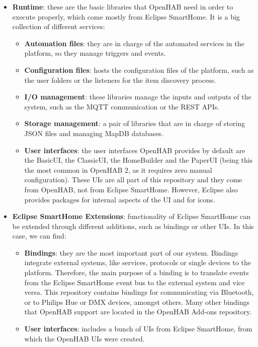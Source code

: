 \begin{itemize}
	\item \textbf{Runtime}: these are the basic libraries that OpenHAB need in order to execute properly, which come mostly from Eclipse 
	SmartHome. It is a big collection of different services:
	\begin{itemize}
		\item \textbf{Automation files}: they are in charge of the automated services in the platform, so they manage triggers and events.
		\item \textbf{Configuration files}: hosts the configuration files of the platform, such as the user folders or the listeners for the 
		item discovery process.
		\item \textbf{I/O management}: these libraries manage the inputs and outputs of the system, such as the MQTT communication 
		or the REST APIs.
		\item \textbf{Storage management}: a pair of libraries that are in charge of storing JSON files and managing MapDB databases. 
		\item \textbf{User interfaces}: the user interfaces OpenHAB provides by default are the BasicUI, the ClassicUI, the HomeBuilder 
		and the PaperUI (being this the most common in OpenHAB 2, as it requires zero manual configuration). These UIs are all part 
		of this repository and they come from OpenHAB, not from Eclipse SmartHome. However, Eclipse also provides packages for 
		internal aspects of the UI and for icons.
	\end{itemize}
	\item \textbf{Eclipse SmartHome Extensions}: functionality of Eclipse SmartHome can be extended through different additions, such 
	as bindings or other UIs. In this case, we can find:
	\begin{itemize}
		\item \textbf{Bindings}: they are the most important part of our system. Bindings integrate external systems, like services, protocols 
		or single devices to the platform. Therefore, the main purpose of a binding is to translate events from the Eclipse SmartHome 
		event bus to the external system and vice versa. This repository contains bindings for communicating via Bluetooth, or to Philips 
		Hue or DMX devices, amongst others. Many other bindings that OpenHAB support are located in the OpenHAB Add-ons repository.
		\item \textbf{User interfaces}: includes a bunch of UIs from Eclipse SmartHome, from which the OpenHAB UIs were created.

\end{itemize}
\end{itemize}
